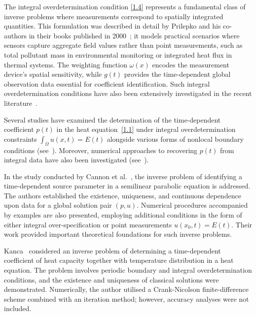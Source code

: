 \documentclass[reqno]{amsart}
\begin{document}
The integral overdetermination condition \eqref{1.4} represents a fundamental class of inverse problems where measurements correspond to spatially integrated quantities. This formulation was described in detail by Prilepko and his co-authors in their books published in 2000~\cite{Prilepko2000}; it models practical scenarios where sensors capture aggregate field values rather than point measurements, such as total pollutant mass in environmental monitoring or integrated heat flux in thermal systems. The weighting function $\omega(x)$ encodes the measurement device's spatial sensitivity, while 
$g(t)$ provides the time-dependent global observation data essential for coefficient identification. Such integral overdetermination conditions have also been extensively investigated in the recent literature~\cite{Grim20,VanBock22,Hendy22,Karel22,Durd24,Suragan25,Durd25,DurdRah25}.   

Several studies have examined the determination of the time-dependent coefficient $p(t)$ in the heat equation~\eqref{1.1} under integral overdetermination constraints $\int_{\Omega}u(x,t)=E(t)$  alongside various forms of nonlocal boundary conditions (see~\cite{Cannon92,Wang92,Dehghan01,Ivanchov01,Fatullayev08,Kerimov12,Kanca13,Hazanee13,Hazanee14,Durdiev22,Suragan24}). Moreover, numerical approaches to recovering $p(t)$ from integral data have also been investigated (see~\cite{Cannon92,Kanca13,Hazanee13,Hazanee14,Durdiev22}).

In the study conducted by Cannon et al.~\cite{Cannon92}, the inverse problem of identifying a time-dependent source parameter in a semilinear parabolic equation is addressed. The authors established the existence, uniqueness, and continuous dependence upon data for a global solution pair $(p,u)$. Numerical procedures accompanied by examples are also presented, employing additional conditions in the form of either integral over-specification or point measurements $u(x_0,t) = E(t)$. Their work provided important theoretical foundations for such inverse problems.

Kanca~\cite{Kanca13} considered an inverse problem of determining a time-dependent coefficient of heat capacity together with temperature distribution in a heat equation. The problem involves periodic boundary and integral overdetermination conditions, and the existence and uniqueness of classical solutions were demonstrated. Numerically, the author utilised a Crank-Nicolson finite-difference scheme combined with an iteration method; however, accuracy analyses were not included.
\end{document}
